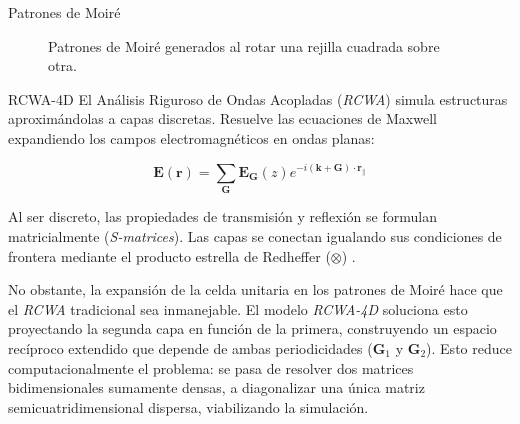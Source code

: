\documentclass[final]{beamer}
\newlength{\colwidth}
\begin{document}
\begin{frame}[t]
\begin{columns}[t]
\begin{column}{\colwidth}
\begin{block}{Patrones de Moiré}
\begin{figure}[h]
\begin{minipage}[t]{0.45\linewidth}
              \label{fig:moire5}
            \end{minipage}
            \caption{Patrones de Moiré generados al rotar una rejilla cuadrada sobre otra.}
            \label{fig:moire}
          \end{figure}
        \end{block}

        \begin{block}{RCWA-4D}
          El Análisis Riguroso de Ondas Acopladas (\textit{RCWA}) simula estructuras aproximándolas a capas discretas. Resuelve las ecuaciones de Maxwell expandiendo los campos electromagnéticos en ondas planas:

          \begin{equation}
            \mathbf{E}(\mathbf{r}) = \sum_{\mathbf{G}} \mathbf{E}_{\mathbf{G}}(z) e^{-i(\mathbf{k} + \mathbf{G})\cdot \mathbf{r}_\parallel}
          \end{equation}

          Al ser discreto, las propiedades de transmisión y reflexión se formulan matricialmente (\textit{S-matrices}). Las capas se conectan igualando sus condiciones de frontera mediante el producto estrella de Redheffer ($\otimes$) \cite{lou2025rcwa4d}.


          No obstante, la expansión de la celda unitaria en los patrones de Moiré hace que el \textit{RCWA} tradicional sea inmanejable. El modelo \textit{RCWA-4D} soluciona esto proyectando la segunda capa en función de la primera, construyendo un espacio recíproco extendido que depende de ambas periodicidades ($\mathbf{G}_1$ y $\mathbf{G}_2$). Esto reduce computacionalmente el problema: se pasa de resolver dos matrices bidimensionales sumamente densas, a diagonalizar una única matriz semicuatridimensional dispersa, viabilizando la simulación.
        \end{block}



\end{column}
\end{columns}
\end{frame}
\end{document}
